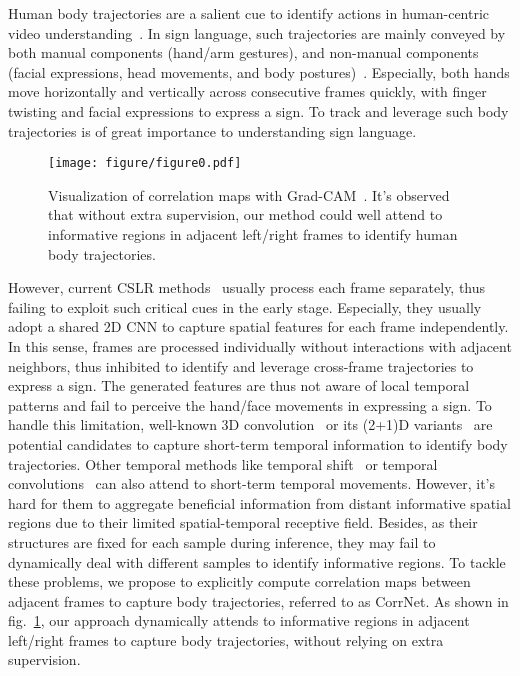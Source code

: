 \documentclass[10pt,twocolumn,letterpaper]{article}
\begin{document}
Human body trajectories are a salient cue to identify actions in human-centric video understanding~\cite{wang2020video}. In sign language, such trajectories are mainly conveyed by both manual components (hand/arm gestures), and non-manual components (facial expressions, head movements, and body postures)~\cite{dreuw2007speech,ong2005automatic}. Especially, both hands move horizontally and vertically across consecutive frames quickly, with finger twisting and facial expressions to express a sign. To track and leverage such body trajectories is of great importance to understanding sign language. 

\begin{figure}[t]
  \centering
  \texttt{[image: figure/figure0.pdf]}
  \caption{Visualization of correlation maps with Grad-CAM~\cite{selvaraju2017grad}. It's observed that without extra supervision, our method could well attend to informative regions in adjacent left/right frames to identify human body trajectories. }
  \label{fig0}
  \vspace{-7px}
\end{figure}

However, current CSLR methods~\cite{pu2020boosting,cheng2020fully,cui2019deep,niu2020stochastic,Min_2021_ICCV,zuo2022c2slr,hao2021self} usually process each frame separately, thus failing to exploit such critical cues in the early stage. Especially, they usually adopt a shared 2D CNN to capture spatial features for each frame independently. In this sense, frames are processed individually without interactions with adjacent neighbors, thus inhibited to identify and leverage cross-frame trajectories to express a sign. The generated features are thus not aware of local temporal patterns and fail to perceive the hand/face movements in expressing a sign. To handle this limitation, well-known 3D convolution~\cite{carreira2017quo} or its (2+1)D variants~\cite{tran2018closer,xie2018rethinking} are potential candidates to capture short-term temporal information to identify body trajectories. Other temporal methods like temporal shift~\cite{lin2019tsm} or temporal convolutions~\cite{liu2020teinet} can also attend to short-term temporal movements. However, it's hard for them to aggregate beneficial information from distant informative spatial regions due to their limited spatial-temporal receptive field. Besides, as their structures are fixed for each sample during inference, they may fail to dynamically deal with different samples to identify informative regions. To tackle these problems, we propose to explicitly compute correlation maps between adjacent frames to capture body trajectories, referred to as CorrNet. As shown in fig.~\ref{fig0}, our approach dynamically attends to informative regions in adjacent left/right frames to capture body trajectories, without relying on extra supervision. 
\end{document}
